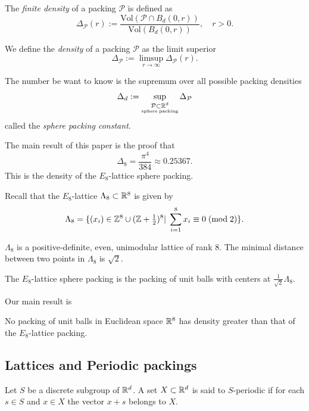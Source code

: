 \begin{definition} The \emph{finite density} of a packing $\mathcal{P}$ is defined as
$$\Delta_{\mathcal{P}}(r):=\frac{\mathrm{Vol}(\mathcal{P}\cap B_d(0,r))}{\mathrm{Vol}(B_d(0,r))},\quad r>0.$$
\end{definition}

\begin{definition} We define the \emph{density} of a packing $\mathcal{P}$ as the limit superior
$$\Delta_{\mathcal{P}}:=\limsup\limits_{r\to\infty}\Delta_{\mathcal{P}}(r). $$
\end{definition}

\begin{definition}
The number be want to know is the supremum over all possible packing densities
$$\Delta_d:=\sup\limits_{\substack{\mathcal{P}\subset\mathbb{R}^d\\ \scriptscriptstyle\mathrm{sphere}\;\mathrm{packing}}}\Delta_{\mathcal{P}} $$
called the \emph{sphere packing constant}.
\end{definition}

The main result of this paper is the proof that $$\Delta_8=\frac{\pi^4}{384}\approx 0.25367.$$
This is the density of the $E_8$-lattice sphere packing.
\begin{definition}Recall that the $E_8$-lattice $\Lambda_8\subset\mathbb{R}^8$ is given by
$$\Lambda_8=\{(x_i)\in\mathbb{Z}^8\cup(\mathbb{Z}+\textstyle\frac12\displaystyle )^8|\;\sum_{i=1}^8x_i\equiv 0\;(\mathrm{mod\;2})\}.$$
\end{definition}
\begin{lemma}$\Lambda_8$ is a positive-definite, even, unimodular lattice of rank 8. The minimal distance between two points in $\Lambda_8$ is $\sqrt{2}$.
\end{lemma}
\begin{definition}
The $E_8$-lattice sphere packing is the packing of unit balls with centers at $\frac{1}{\sqrt{2}}\Lambda_8.$
\end{definition}
Our main result is
\begin{theorem}\label{thm: main}
No packing of unit balls
in Euclidean space $\mathbb{R}^8$ has density greater than that of the $E_8$-lattice packing.
\end{theorem}

\subsection{Lattices and Periodic packings}
\begin{definition} Let $S$ be a discrete subgroup of $\mathbb{R}^d$. A set $X\subset\mathbb{R}^d$ is said to $S$-periodic if for each $s\in S$ and $x\in X$ the vector $x+s$ belongs to $X$.
\end{definition}

